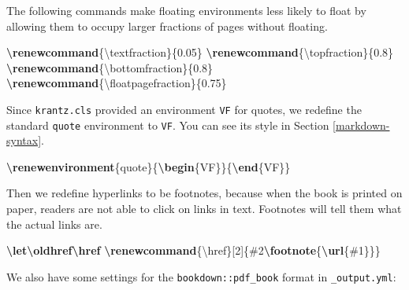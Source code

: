 \documentclass[
  12pt,
]{krantz}
\newenvironment{Shaded}{\begin{snugshade}}{\end{snugshade}}
\newcommand{\ExtensionTok}[1]{#1}
\newcommand{\FunctionTok}[1]{\textcolor[rgb]{0.13,0.29,0.53}{\textbf{#1}}}
\newcommand{\KeywordTok}[1]{\textcolor[rgb]{0.13,0.29,0.53}{\textbf{#1}}}
\newcommand{\NormalTok}[1]{#1}
\theoremstyle{definition}
\theoremstyle{definition}
\theoremstyle{definition}
\theoremstyle{definition}
\theoremstyle{remark}
\begin{document}
The following commands make floating environments less likely to float by allowing them to occupy larger fractions of pages without floating.

\begin{Shaded}
\begin{Highlighting}[]
\FunctionTok{\textbackslash{}renewcommand}\NormalTok{\{}\ExtensionTok{\textbackslash{}textfraction}\NormalTok{\}\{0.05\}}
\FunctionTok{\textbackslash{}renewcommand}\NormalTok{\{}\ExtensionTok{\textbackslash{}topfraction}\NormalTok{\}\{0.8\}}
\FunctionTok{\textbackslash{}renewcommand}\NormalTok{\{}\ExtensionTok{\textbackslash{}bottomfraction}\NormalTok{\}\{0.8\}}
\FunctionTok{\textbackslash{}renewcommand}\NormalTok{\{}\ExtensionTok{\textbackslash{}floatpagefraction}\NormalTok{\}\{0.75\}}
\end{Highlighting}
\end{Shaded}

Since \texttt{krantz.cls} provided an environment \texttt{VF} for quotes, we redefine the standard \texttt{quote} environment to \texttt{VF}. You can see its style in Section \ref{markdown-syntax}.

\begin{Shaded}
\begin{Highlighting}[]
\FunctionTok{\textbackslash{}renewenvironment}\NormalTok{\{quote\}\{}\KeywordTok{\textbackslash{}begin}\NormalTok{\{}\ExtensionTok{VF}\NormalTok{\}\}\{}\KeywordTok{\textbackslash{}end}\NormalTok{\{}\ExtensionTok{VF}\NormalTok{\}\}}
\end{Highlighting}
\end{Shaded}

Then we redefine hyperlinks to be footnotes, because when the book is printed on paper, readers are not able to click on links in text. Footnotes will tell them what the actual links are.

\begin{Shaded}
\begin{Highlighting}[]
\FunctionTok{\textbackslash{}let\textbackslash{}oldhref\textbackslash{}href}
\FunctionTok{\textbackslash{}renewcommand}\NormalTok{\{}\ExtensionTok{\textbackslash{}href}\NormalTok{\}[2]\{\#2}\FunctionTok{\textbackslash{}footnote}\NormalTok{\{}\FunctionTok{\textbackslash{}url}\NormalTok{\{\#1\}\}\}}
\end{Highlighting}
\end{Shaded}

We also have some settings for the \texttt{bookdown::pdf\_book} format in \texttt{\_output.yml}:
\end{document}

